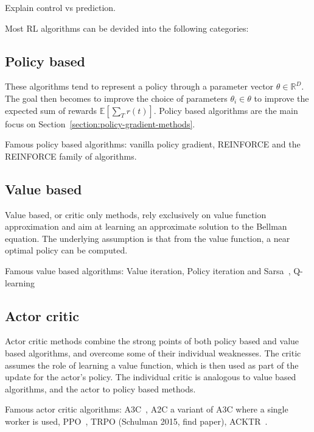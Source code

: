 \documentclass{../main.tex}{subfiles}
\begin{document}

Explain control vs prediction.

Most RL algorithms can be devided into the following categories:
\subsection{Policy based}
These algorithms tend to represent a policy through a parameter vector $\theta
\in \mathbb{R}^D$. The goal then becomes to improve the choice of parameters
$\theta_i \in \theta$ to improve the expected sum of rewards
$\mathbb{E}[\sum_{T} r(t)]$. Policy based algorithms are the main focus on Section~\ref{section:policy-gradient-methods}.

Famous policy based algorithms: vanilla policy gradient, REINFORCE\citep{Williams1992} and the REINFORCE family of algorithms\@.

\subsection{Value based}
Value based, or critic only methods, rely exclusively on value function approximation and aim at learning an approximate solution to the Bellman equation. The underlying assumption is that from the value function, a near optimal policy can be computed.

Famous value based algorithms: Value iteration, Policy iteration and Sarsa~\cite{Sutton1998}, Q-learning~\citep{Watkins1989}

\subsection{Actor critic}

Actor critic methods combine the strong points of both policy based and value based algorithms, and overcome some of their individual weaknesses. The critic assumes the role of learning a value function, which is then used as part of the update for the actor's policy. The individual critic is analogous to value based algorithms, and the actor to policy based methods.

Famous actor critic algorithms: A3C~\citep{Mnih2016}, A2C a variant of A3C where a single worker is used, PPO~\citep{Schulman2017}, TRPO (Schulman 2015, find paper), ACKTR~\citep{Wu2017}.
\end{document}
